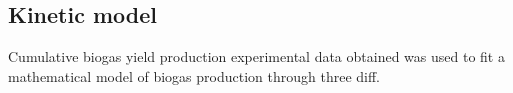 \subsection{Kinetic model}
Cumulative biogas yield production experimental data obtained was used to fit a mathematical model of biogas production through three diff.